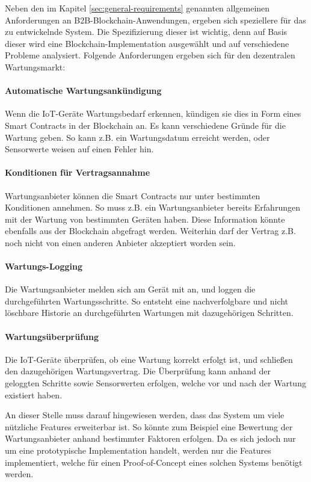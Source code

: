 Neben den im Kapitel \ref{sec:general-requirements} genannten allgemeinen Anforderungen an B2B-Blockchain-Anwendungen, ergeben sich speziellere für das zu entwickelnde System. Die Spezifizierung dieser ist wichtig, denn auf Basis dieser wird eine Blockchain-Implementation ausgewählt und auf verschiedene Probleme analysiert. Folgende Anforderungen ergeben sich für den dezentralen Wartungsmarkt:

\paragraph{Automatische Wartungsankündigung}
Wenn die IoT-Geräte Wartungsbedarf erkennen, kündigen sie dies in Form eines Smart Contracts in der Blockchain an. Es kann verschiedene Gründe für die Wartung geben. So kann z.B. ein Wartungsdatum erreicht werden, oder Sensorwerte weisen auf einen Fehler hin.

\paragraph{Konditionen für Vertragsannahme}
Wartungsanbieter können die Smart Contracts nur unter bestimmten Konditionen annehmen. So muss z.B. ein Wartungsanbieter bereits Erfahrungen mit der Wartung von bestimmten Geräten haben. Diese Information könnte ebenfalls aus der Blockchain abgefragt werden. Weiterhin darf der Vertrag z.B. noch nicht von einen anderen Anbieter akzeptiert worden sein. 

\paragraph{Wartungs-Logging}
Die Wartungsanbieter melden sich am Gerät mit an, und loggen die durchgeführten Wartungsschritte. So entsteht eine nachverfolgbare und nicht löschbare Historie an durchgeführten Wartungen mit dazugehörigen Schritten.

\paragraph{Wartungsüberprüfung}
Die IoT-Geräte überprüfen, ob eine Wartung korrekt erfolgt ist, und schließen den dazugehörigen Wartungsvertrag. Die Überprüfung kann anhand der geloggten Schritte sowie Sensorwerten erfolgen, welche vor und nach der Wartung existiert haben.

An dieser Stelle muss darauf hingewiesen werden, dass das System um viele nützliche Features erweiterbar ist. So könnte zum Beispiel eine Bewertung der Wartungsanbieter anhand bestimmter Faktoren erfolgen. Da es sich jedoch nur um eine prototypische Implementation handelt, werden nur die Features implementiert, welche für einen Proof-of-Concept eines solchen Systems benötigt werden.

